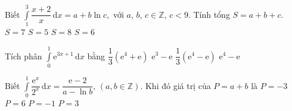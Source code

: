 \begin{ex}%
	Biết $\displaystyle\int\limits_1^3\dfrac{x+2}{x}\mathrm{\,d}x=a+b\ln c,$ với $a$, $b$, $c\in\mathbb{Z}$, $c<9.$ Tính tổng $S=a+b+c.$
	\choice
	{\True $ S=7$}
	{$ S=5$}
	{$ S=8$}
	{$ S=6$}
\end{ex}
%
\begin{ex}%
	Tích phân $\displaystyle\int\limits_0^1\mathrm{e}^{3x+1}\mathrm{\,d}x$ bằng
	\choice
	{$\dfrac{1}{3}\left(\mathrm{e}^4+\mathrm{e}\right)$}
	{$\mathrm{e}^3-\mathrm{e}$}
	{\True $\dfrac{1}{3}\left(\mathrm{e}^4-\mathrm{e}\right)$}
	{$\mathrm{e}^4-\mathrm{e}$}
\end{ex}

\begin{ex}%
	Biết $\displaystyle\int\limits_0^1\dfrac{\mathrm{e}^x}{2^x}\mathrm{\,d}x=\dfrac{\mathrm{e-2}}{a-\ln b }$, $\left(a,b\in\mathbb{Z}\right)$. Khi đó giá trị của $ P=a+b$ là
	\choice
	{$ P=-3$}
	{\True $ P=6$}
	{$ P=-1$}
	{$ P=3$}
\end{ex}

